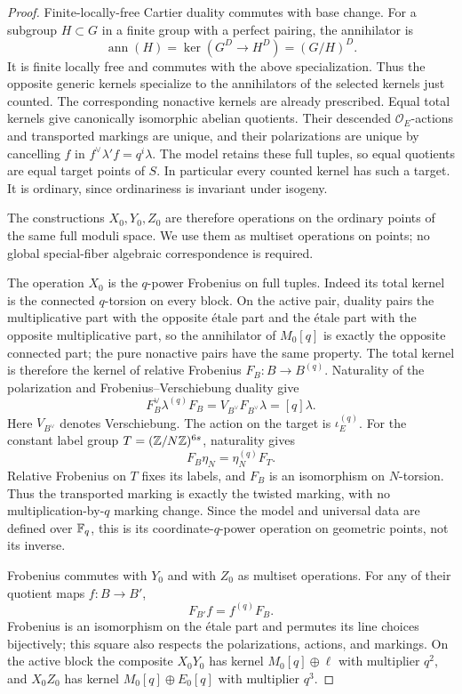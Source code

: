 \begin{proof}
Finite-locally-free Cartier duality commutes with base change.
For a subgroup \(H\subset G\) in a finite group with a perfect
pairing, the annihilator is
\[
\operatorname{ann}(H)
 =\ker(G^D\longrightarrow H^D)=(G/H)^D.
\]
It is finite locally free and commutes with the above
specialization.  Thus the opposite generic kernels specialize
to the annihilators of the selected kernels just counted.
The corresponding nonactive kernels are already prescribed.
Equal total kernels give canonically isomorphic abelian
quotients.  Their descended \(\mathcal O_E\)-actions and
transported markings are unique, and their polarizations are
unique by cancelling \(f\) in \(f^\vee\lambda'f=q^i\lambda\).
The model retains these full tuples, so equal quotients are
equal target points of \(S\).  In particular every counted
kernel has such a target.  It is ordinary, since ordinariness
is invariant under isogeny.

The constructions \(X_0,Y_0,Z_0\) are therefore operations on
the ordinary points of the same full moduli space.  We use them
as multiset operations on points; no global special-fiber
algebraic correspondence is required.

The operation \(X_0\) is the \(q\)-power Frobenius on full tuples.
Indeed its total kernel is the connected \(q\)-torsion on every
block.  On the active pair, duality pairs the multiplicative
part with the opposite étale part and the étale part with the
opposite multiplicative part, so the annihilator of \(M_0[q]\)
is exactly the opposite connected part; the pure nonactive
pairs have the same property.  The total kernel is therefore
the kernel of relative Frobenius
\(F_B:B\to B^{(q)}\).  Naturality of the polarization and
Frobenius--Verschiebung duality give
\[
F_B^\vee\lambda^{(q)}F_B
 =V_{B^\vee}F_{B^\vee}\lambda=[q]\lambda.
\]
Here \(V_{B^\vee}\) denotes Verschiebung.
The action on the target is \(\iota_E^{(q)}\).  For the constant
label group \(T=(\mathbb{Z}/N\mathbb{Z})^{6s}\), naturality gives
\[
F_B\eta_N=\eta_N^{(q)}F_T.
\]
Relative Frobenius on \(T\) fixes its labels, and \(F_B\) is an
isomorphism on \(N\)-torsion.  Thus the transported marking is
exactly the twisted marking, with no multiplication-by-\(q\)
marking change.  Since the model and universal data are defined
over \(\mathbb{F}_q\), this is its coordinate-\(q\)-power operation on
geometric points, not its inverse.

Frobenius commutes with \(Y_0\) and with \(Z_0\) as multiset
operations.  For any of their quotient maps \(f:B\to B'\),
\[
F_{B'}f=f^{(q)}F_B.
\]
Frobenius is an isomorphism on the étale part and permutes its
line choices bijectively; this square also respects the
polarizations, actions, and markings.  On the active block the
composite \(X_0Y_0\) has kernel \(M_0[q]\oplus\ell\) with
multiplier \(q^2\), and \(X_0Z_0\) has kernel
\(M_0[q]\oplus E_0[q]\) with multiplier \(q^3\).


\end{proof}
